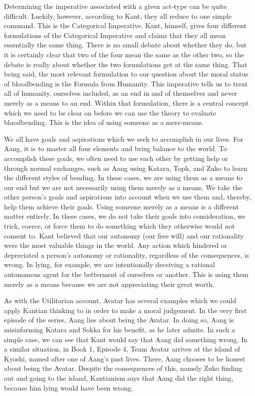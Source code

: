 Determining the imperative associated with a given act-type can be quite difficult. Luckily, however, according to Kant, they all reduce to one simple command. This is the Categorical Imperative.  Kant, himself, gives four different formulations of the Categorical Imperative and claims that they all mean essentially the same thing. There is no small debate about whether they do, but it is certainly clear that two of the four mean the same as the other two, so the debate is really about whether the two formulations get at the same thing. That being said, the most relevant formulation to our question about the moral status of bloodbending is the Formula from Humanity.\autocite[pg. 38]{Kant1} This imperative tells us to treat all of humanity, ourselves included, as an end in and of themselves and never merely as a means to an end. Within that formulation, there is a central concept which we need to be clear on before we can use the theory to evaluate bloodbending. This is the idea of using someone as a mere-means.

We all have goals and aspirations which we seek to accomplish in our lives. For Aang, it is to master all four elements and bring balance to the world. To accomplish these goals, we often need to use each other by getting help or through normal exchanges, such as Aang using Katara, Toph, and Zuko to learn the different styles of bending. In these cases, we are using them as a means to our end but we are not necessarily using them merely as a means. We take the other person’s goals and aspirations into account when we use them and, thereby, help them achieve their goals. Using someone merely as a means is a different matter entirely. In these cases, we do not take their goals into consideration, we trick, coerce, or force them to do something which they otherwise would not consent to. Kant believed that our autonomy (our free will) and our rationality were the most valuable things in the world. Any action which hindered or depreciated a person’s autonomy or rationality, regardless of the consequences, is wrong. In lying, for example, we are intentionally deceiving a rational autonomous agent for the betterment of ourselves or another. This is using them merely as a means because we are not appreciating their great worth.

As with the Utilitarian account, Avatar has several examples which we could apply Kantian thinking to in order to make a moral judgement. In the very first episode of the series, Aang lies about being the Avatar. In doing so, Aang is misinforming Katara and Sokka for his benefit, as he later admits.\autocite[11:31-11:52]{Iceberg1} In such a simple case, we can see that Kant would say that Aang did something wrong. In a similar situation, in Book 1, Episode 4, Team Avatar arrives at the island of Kyoshi, named after one of Aang’s past lives.\autocite[06:05-07:35]{Warriors1} There, Aang chooses to be honest about being the Avatar. Despite the consequences of this, namely Zuko finding out and going to the island, Kantianism says that Aang did the right thing, because him lying would have been wrong.

